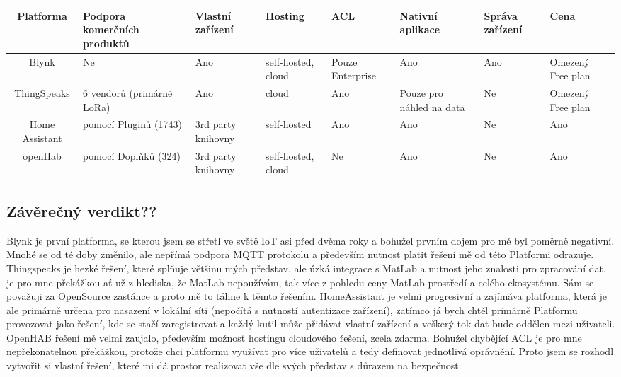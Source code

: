 \documentclass[thesis=B,czech]{FITthesis}[2019/12/23]
\begin{document}
\begin{center} %
    \begin{tabular}{ |c| m{5em}| m{5em}|m{5em}|m{4em}| m{5em}| m{4em}| m{4em}| }
        \hline
        Platforma      & Podpora komerčních produktů & Vlastní zařízení   & Hosting            & ACL              & Nativní aplikace         & Správa zařízení & Cena              \\
        \hline
        Blynk          & Ne                          & Ano                & self-hosted, cloud & Pouze Enterprise & Ano                      & Ano             & Omezený Free plan \\
        \hline
        ThingSpeaks    & 6 vendorů (primárně LoRa)   & Ano                & cloud              & Ano              & Pouze pro náhled na data & Ne              & Omezený Free plan \\
        \hline
        Home Assistant & pomocí Pluginů (1743)       & 3rd party knihovny & self-hosted        & Ano              & Ano                      & Ne              & Ano               \\
        \hline
        openHab        & pomocí Doplňků (324)        & 3rd party knihovny & self-hosted, cloud & Ne               & Ano                      & Ne              & Ano               \\
        \hline
    \end{tabular}
\end{center}

\subsection{Závěrečný verdikt??}
Blynk je první platforma, se kterou jsem se střetl ve světě IoT asi před dvěma roky a bohužel prvním dojem pro mě byl poměrně negativní. Mnohé se od té doby změnilo, ale nepřímá podpora MQTT protokolu a především nutnost platit řešení mě od této Platformi odrazuje. Thingspeaks je hezké řešení, které splňuje většinu mých představ, ale úzká integrace s MatLab a nutnost jeho znalosti pro zpracování dat, je pro mne překážkou ať už z hlediska, že MatLab nepoužívám, tak více z pohledu ceny MatLab prostředí a celého ekosystému. Sám se považuji za OpenSource zastánce a proto mě to táhne k těmto řešením. HomeAssistant je velmi progresivní a zajímáva platforma, která je ale primárně určena pro nasazení v lokální síti (nepočítá s nutností autentizace zařízení), zatímco já bych chtěl primárně Platformu provozovat jako řešení, kde se stačí zaregistrovat a každý kutil může přidávat vlastní zařízení a veškerý tok dat bude oddělen mezi uživateli. OpenHAB řešení mě velmi zaujalo, především možnost hostingu cloudového řešení, zcela zdarma. Bohužel chybějící ACL je pro mne nepřekonatelnou překážkou, protože chci platformu využívat pro více uživatelů a tedy definovat jednotlivá oprávnění. Proto jsem se rozhodl vytvořit si vlastní řešení, které mi dá prostor realizovat vše dle svých představ s důrazem na bezpečnost.
\end{document}
